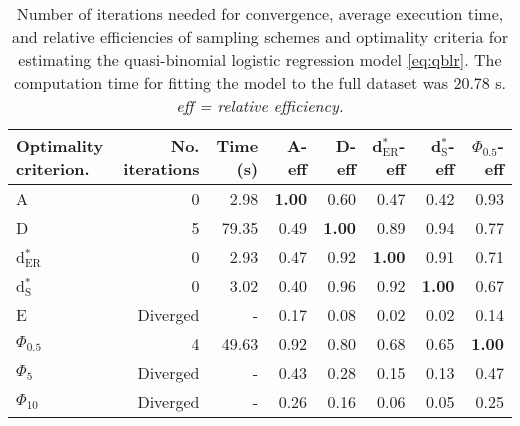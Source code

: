 \begin{table}[htb!]
\centering
\caption{Number of iterations needed for convergence, average execution time, and relative efficiencies of sampling schemes and optimality criteria for estimating the quasi-binomial logistic regression model \eqref{eq:qblr}. The computation time for fitting the model to the full dataset was 20.78 s. \textit{eff = relative efficiency.}} 
\label{tab:impact_speed_response_surface}
\begin{tabular}{lrrrrrrr}
 Optimality criterion. & No. iterations & Time (s) & A-eff & D-eff & d$^*_{\mathrm{ER}}$-eff & d$^*_{\mathrm{S}}$-eff & $\Phi_{0.5}$-eff \\ 
  \hline
A & 0 & 2.98 & \textbf{1.00} & 0.60 & 0.47 & 0.42 & 0.93 \\ 
  D & 5 & 79.35 & 0.49 & \textbf{1.00} & 0.89 & 0.94 & 0.77 \\ 
  d$^*_{\mathrm{ER}}$ & 0 & 2.93 & 0.47 & 0.92 & \textbf{1.00} & 0.91 & 0.71 \\ 
  d$^*_{\mathrm{S}}$ & 0 & 3.02 & 0.40 & 0.96 & 0.92 & \textbf{1.00} & 0.67 \\ 
  E & Diverged & - & 0.17 & 0.08 & 0.02 & 0.02 & 0.14 \\ 
  $\Phi_{0.5}$ & 4 & 49.63 & 0.92 & 0.80 & 0.68 & 0.65 & \textbf{1.00} \\ 
  $\Phi_5$ & Diverged & - & 0.43 & 0.28 & 0.15 & 0.13 & 0.47 \\ 
  $\Phi_{10}$ & Diverged & - & 0.26 & 0.16 & 0.06 & 0.05 & 0.25 \\ 
   \hline
\end{tabular}
\end{table}
